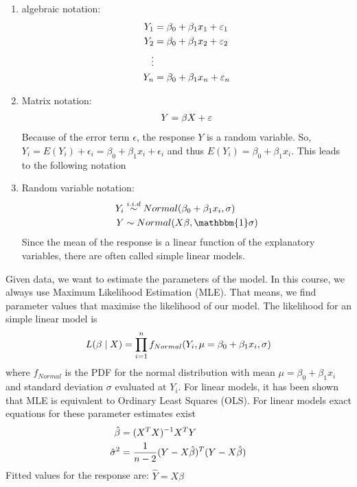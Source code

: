 \begin{definition}
	\begin{enumerate}[label=(\alph*)]
		\item algebraic notation:
		\begin{align}
			Y_1 &= \beta_0 + \beta_1x_1 + \epsilon_1 \notag \\
			Y_2 &= \beta_0 + \beta_1x_2 + \epsilon_2 \notag \\
			\vdots  \notag \\
			Y_n &= \beta_0 + \beta_1x_n + \epsilon_n \notag
		\end{align}
		\item Matrix notation:
		\begin{align}
			Y = \beta X + \epsilon \notag 
		\end{align}
		Because of the error term $\epsilon$, the response $Y$ is a random variable. So, $Y_i = E(Y_i)+\epsilon_i = \beta_0+\beta_1x_i+\epsilon_i$ and thus $E(Y_i) = \beta_0+\beta_1x_i$. This leads to the following notation
		\item Random variable notation: 
		\begin{align}
			Y_i &\overset{i.i.d}{\sim}Normal(\beta_0+\beta_1x_i,\sigma) \notag \\
			Y &\sim Normal(X\beta,\mathbbm{1}\sigma) \notag
		\end{align}
		Since the mean of the response is a linear function of the explanatory variables, there are often called simple linear models.
	\end{enumerate}
\end{definition}

Given data, we want to estimate the parameters of the model. In this course, we always use Maximum Likelihood Estimation (MLE). That means, we find parameter values that maximise the likelihood of our model. The likelihood for an simple linear model is
\begin{align}
	L(\beta\mid X) = \prod_{i=1}^{n} f_{Normal}(Y_i,\mu=\beta_0+\beta_1x_i,\sigma) \notag
\end{align}
where $f_{Normal}$ is the PDF for the normal distribution with mean $\mu=\beta_0+\beta_1x_i$ and standard deviation $\sigma$ evaluated at $Y_i$. For linear models, it has been shown that MLE is equivalent to Ordinary Least Squares (OLS). For linear models exact equations for these parameter estimates exist
\begin{align}
	\hat{\beta} &= (X^TX)^{-1}X^TY \notag \\
	\hat{\sigma}^2 &= \frac{1}{n-2}(Y-X\hat{\beta})^T(Y-X\hat{\beta})\notag
\end{align}
Fitted values for the response are: $\hat{Y} = X\hat{\beta}$

